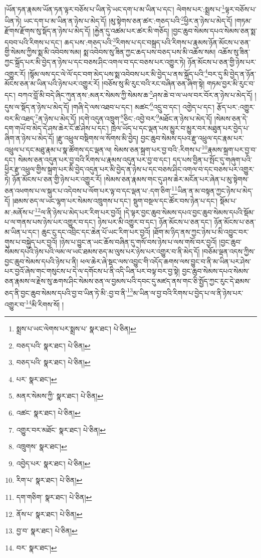 །ཡོན་ཏན་རྣམས་ཡོན་ཏན་ལྟར་བཅོས་པ་ཡིན་ཏེ་ཡང་དག་པ་མ་ཡིན་པ་དང་། ལེགས་པར་:སྨྲས་པ་\footnote{སྨྲས་པ་ཡང་ལེགས་པར་སྨྲས་པ་  སྣར་ཐང་།  པེ་ཅིན། }ལྟར་བཅོས་པ་ཡིན་ཏེ། ཡང་དག་པ་མ་ཡིན་ན་ཉེས་པ་མེད་དོ། །མུ་སྟེགས་ཅན་ཚར་:གཅད་པའི་\footnote{བཅད་པའི་  སྣར་ཐང་།  པེ་ཅིན། }ཕྱིར་ན་ཉེས་པ་མེད་དོ། །གཏམ་རྫོགས་རྫོགས་སུ་སྡོད་ན་ཉེས་པ་མེད་དོ། །རྐྱེན་དུ་འཚམ་པར་ཚར་མི་གཅོད། །བྱང་ཆུབ་སེམས་དཔའ་སེམས་ཅན་སྨ་དབབ་པའི་རིགས་པ་དང་། ཆད་པས་:གཅད་པའི་\footnote{བཅད་པའི་  སྣར་ཐང་།  པེ་ཅིན། }རིགས་པ་དང་བསྐྲད་པའི་རིགས་པ་རྣམས་ཉོན་མོངས་པ་ཅན་གྱི་སེམས་ཀྱིས་སྨ་མི་འབེབས་སམ། སྨ་འབེབས་སུ་ཟིན་ཀྱང་ཆད་པས་བཅད་པས་མི་འཆོས་སམ། འཆོས་སུ་ཟིན་ཀྱང་སྐྲོད་པར་མི་བྱེད་ན་ཉེས་པ་དང་བཅས་ཤིང་འགལ་བ་དང་བཅས་པར་འགྱུར་ཏེ། ཉོན་མོངས་པ་ཅན་གྱི་ཉེས་པར་འགྱུར་རོ། །སྙོམ་ལས་དང་ལེ་ལོ་དང་བག་མེད་པས་སྨ་འབེབས་པར་མི་བྱེད་པ་ནས་སྐྲོད་པའི་\footnote{པར་  སྣར་ཐང་། }བར་དུ་མི་བྱེད་ན་ཉོན་མོངས་ཅན་མ་ཡིན་པའི་ཉེས་པར་འགྱུར་རོ། །བཅོས་སུ་མི་རུང་བའི་རང་བཞིན་ཅན་ཞིག་སྟེ། གཏམ་བྱར་མི་རུང་བ་དང་། བཀའ་བློ་མི་བདེ་ཞིང་ཀུན་ནས་:མནར་སེམས་ཀྱི་སེམས་ཆ་\footnote{མནར་སེམས་ཀྱི་  སྣར་ཐང་།  པེ་ཅིན། }ཤས་ཆེ་བ་ལ་ཡལ་བར་བོར་ན་ཉེས་པ་མེད་དོ། །དུས་ལ་སྡོད་ན་ཉེས་པ་མེད་དོ། །གཞི་དེ་ལས་འཐབ་པ་དང་། མཚང་\footnote{འཚང་  སྣར་ཐང་།  པེ་ཅིན། }འདྲུ་བ་དང་། འགྱེད་པ་དང་། རྩོད་པར་:འགྱུར་བར་མི་འཐད་\footnote{འགྱུར་བར་མཐོང་  སྣར་ཐང་།  པེ་ཅིན། }ན་ཉེས་པ་མེད་དོ། །དགེ་འདུན་འཁྲུག་\footnote{འཁྲུགས་  སྣར་ཐང་། }ཅིང་:འབྱེ་བར་\footnote{འབྱེད་པར་  སྣར་ཐང་།  པེ་ཅིན། }མཐོང་ན་ཉེས་པ་མེད་དོ། །སེམས་ཅན་དེ་དག་གཡོ་བ་མེད་དེ་ཤས་ཆེར་ངོ་ཚ་ཤེས་པ་དང་། ཁྲེལ་ཡོད་པ་དང་ལྡན་པས་མྱུར་བ་མྱུར་བར་མཐུན་པར་བྱེད་པ་ཞིག་ན་ཉེས་པ་མེད་དོ། །རྫུ་འཕྲུལ་བསྡིགས་ལ་སོགས་མི་བྱེད། བྱང་ཆུབ་སེམས་དཔའ་རྫུ་འཕྲུལ་དང་རྣམ་པར་འཕྲུལ་པ་དང་མཐུ་རྣམ་པ་སྣ་ཚོགས་དང་ལྡན་ལ། སེམས་ཅན་སྐྲག་པར་བྱ་བའི་:རིགས་པ་\footnote{རིག་པ་  སྣར་ཐང་།  པེ་ཅིན། }རྣམས་སྐྲག་པར་བྱ་བ་དང་། སེམས་ཅན་འདུན་པར་བྱ་བའི་རིགས་པ་རྣམས་འདུན་པར་བྱ་བ་དང་། དད་པས་བྱིན་པ་སྤོང་དུ་གཞུག་པའི་ཕྱིར་རྫུ་འཕྲུལ་གྱིས་སྐྲག་པར་མི་བྱེད་འདུན་པར་མི་བྱེད་ན་ཉེས་པ་དང་བཅས་ཤིང་འགལ་བ་དང་བཅས་པར་འགྱུར་ཏེ། ཉོན་མོངས་པ་ཅན་གྱི་ཉེས་པར་འགྱུར་རོ། །སེམས་ཅན་རྣམས་གང་དུ་ཤས་ཆེར་མངོན་པར་ཞེན་པ་མུ་སྟེགས་ཅན་འཕགས་པ་ལ་སྐུར་པ་འདེབས་པ་ལོག་པར་ལྟ་བ་དང་ལྡན་པ་:དག་ཅིག་\footnote{དག་གཅིག་  སྣར་ཐང་།  པེ་ཅིན། }ཡིན་ན་མ་བསྟན་ཀྱང་ཉེས་པ་མེད་དོ། །ཐམས་ཅད་ལ་ཡང་ལྷག་པར་སེམས་འཁྲུགས་པ་དང་། སྡུག་བསྔལ་དང་ཚོར་བས་ཉེན་པ་དང་། སྡོམ་པ་མ་:མནོས་པ་\footnote{ནོས་པ་  སྣར་ཐང་།  པེ་ཅིན། }ལ་ནི་ཉེས་པ་མེད་པར་རིག་པར་བྱའོ། །དེ་ལྟར་བྱང་ཆུབ་སེམས་དཔའ་བྱང་ཆུབ་སེམས་དཔའི་སྡོམ་པ་ལ་གནས་པས་ཉེས་པར་འགྱུར་བ་དང་། ཉེས་པར་མི་འགྱུར་བ་དང་། ཉོན་མོངས་པ་ཅན་དང་། ཉོན་མོངས་པ་ཅན་མ་ཡིན་པ་དང་། ཆུང་ངུ་དང་འབྲིང་དང་ཆེན་པོ་ཡང་རིག་པར་བྱའོ། །ཐོག་མ་ཉིད་ནས་ཀྱང་ཉེས་པ་མི་འབྱུང་བར་གུས་པ་བསྐྱེད་པར་བྱའོ། །ཉེས་པ་བྱུང་ན་ཡང་ཆོས་བཞིན་དུ་གསོ་བས་ཉེས་པ་ལས་གསོ་བར་བྱའོ། །བྱང་ཆུབ་སེམས་དཔའི་ཉེས་པའི་ལམ་ལ་ཡང་ཐམས་ཅད་མ་ལུས་པར་ཉེས་པར་འགྱུར་བ་ནི་མེད་དོ། །བཅོམ་ལྡན་འདས་ཀྱིས་བྱང་ཆུབ་སེམས་དཔའི་ཉེས་པ་ནི། ཕལ་ཆེར་ཞེ་སྡང་ལས་འབྱུང་གི་འདོད་ཆགས་ལས་བྱུང་བ་ནི་མ་ཡིན་པར་ཤེས་པར་བྱའོ་ཞེས་གང་གསུངས་པ་དེ་ལ་དགོངས་པ་ནི་འདི་ཡིན་པར་བལྟ་བར་བྱ་སྟེ། བྱང་ཆུབ་སེམས་དཔའ་སེམས་ཅན་རྣམས་ལ་རྗེས་སུ་ཆགས་ཤིང་སེམས་ཅན་ལ་བྱམས་པའི་དབང་དུ་མཛད་ནས་གང་ཅི་སྤྱོད་ཀྱང་རུང་དེ་ཐམས་ཅད་ནི་བྱང་ཆུབ་སེམས་དཔའི་བྱ་བ་ཡིན་ཏེ་མི་:བྱ་བ་ནི་\footnote{བྱ་བ་  སྣར་ཐང་།  པེ་ཅིན། }མ་ཡིན་ལ་བྱ་བའི་རིགས་པ་བྱེད་པ་ལ་ནི་ཉེས་པར་འགྱུར་བ་\footnote{བར་  སྣར་ཐང་། }མི་རིགས་སོ། །
